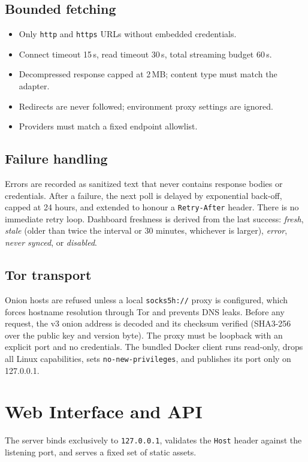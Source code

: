 \documentclass[11pt,a4paper]{article}
\newcommand{\code}[1]{\texttt{\small #1}}
\begin{document}
\subsection{Bounded fetching}\label{sec:fetch}
\begin{itemize}
  \item Only \code{http} and \code{https} URLs without embedded credentials.
  \item Connect timeout 15\,s, read timeout 30\,s, total streaming budget 60\,s.
  \item Decompressed response capped at 2\,MB; content type must match the adapter.
  \item Redirects are never followed; environment proxy settings are ignored.
  \item Providers must match a fixed endpoint allowlist.
\end{itemize}

\subsection{Failure handling}
Errors are recorded as sanitized text that never contains response bodies or credentials. After a failure, the next poll is delayed by exponential back-off, capped at 24 hours, and extended to honour a \code{Retry-After} header. There is no immediate retry loop. Dashboard freshness is derived from the last success: \emph{fresh}, \emph{stale} (older than twice the interval or 30 minutes, whichever is larger), \emph{error}, \emph{never synced}, or \emph{disabled}.

\subsection{Tor transport}
Onion hosts are refused unless a local \code{socks5h://} proxy is configured, which forces hostname resolution through Tor and prevents DNS leaks. Before any request, the v3 onion address is decoded and its checksum verified (SHA3-256 over the public key and version byte). The proxy must be loopback with an explicit port and no credentials. The bundled Docker client runs read-only, drops all Linux capabilities, sets \code{no-new-privileges}, and publishes its port only on 127.0.0.1.

\section{Web Interface and API}
The server binds exclusively to \code{127.0.0.1}, validates the \code{Host} header against the listening port, and serves a fixed set of static assets.
\end{document}
